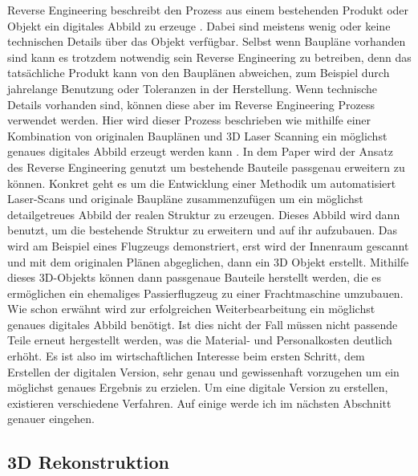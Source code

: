 \documentclass[../main.tex]{subfiles}
\begin{document}
Reverse Engineering beschreibt den Prozess aus einem bestehenden Produkt 
oder Objekt ein digitales Abbild zu erzeuge \cite{Helle.2021}.
Dabei sind meistens wenig oder keine technischen Details über das Objekt
verfügbar. \cite{Helle.2021}  
Selbst wenn Baupläne vorhanden sind kann es trotzdem notwendig sein 
Reverse Engineering zu betreiben, denn das tatsächliche Produkt kann von
den Bauplänen abweichen, zum Beispiel durch jahrelange Benutzung oder
Toleranzen in der Herstellung. Wenn technische Details vorhanden sind,
können diese aber im Reverse Engineering Prozess verwendet werden.
Hier wird dieser Prozess beschrieben wie mithilfe einer Kombination von
originalen Bauplänen und 3D Laser Scanning ein möglichst genaues digitales
Abbild erzeugt werden kann \cite{Monchinger.2021}.
In dem Paper wird der Ansatz des Reverse Engineering genutzt um
bestehende Bauteile passgenau erweitern zu können. Konkret geht es um die
Entwicklung einer Methodik um automatisiert Laser-Scans und originale Baupläne
zusammenzufügen um ein möglichst detailgetreues Abbild der realen Struktur zu
erzeugen. Dieses Abbild wird dann benutzt, um die bestehende Struktur zu 
erweitern und auf ihr aufzubauen. Das wird am Beispiel eines Flugzeugs 
demonstriert, erst wird der Innenraum gescannt und mit dem originalen Plänen
abgeglichen, dann ein 3D Objekt erstellt. Mithilfe dieses 3D-Objekts können 
dann passgenaue Bauteile herstellt werden, die es ermöglichen ein ehemaliges 
Passierflugzeug zu einer Frachtmaschine umzubauen.
Wie schon erwähnt wird zur erfolgreichen Weiterbearbeitung ein möglichst 
genaues digitales Abbild benötigt.
Ist dies nicht der Fall müssen nicht passende Teile erneut hergestellt werden, 
was die Material- und Personalkosten deutlich erhöht. Es ist also im 
wirtschaftlichen Interesse beim ersten Schritt, dem Erstellen der digitalen 
Version, sehr genau und gewissenhaft vorzugehen um ein möglichst genaues Ergebnis
zu erzielen. Um eine digitale Version zu erstellen, existieren verschiedene Verfahren.
Auf einige werde ich im nächsten Abschnitt genauer eingehen.


\subsection{3D Rekonstruktion}
\end{document}
